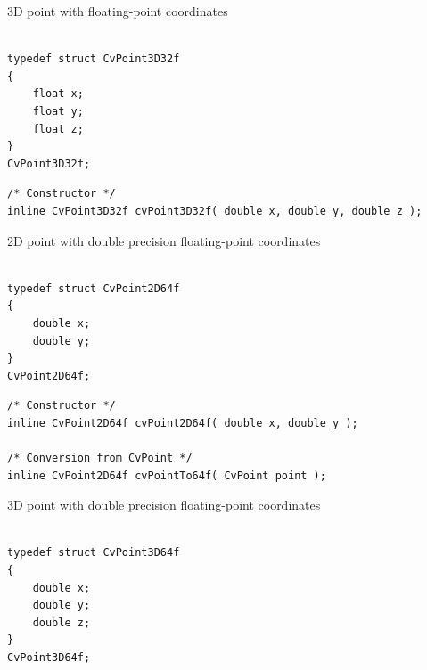 \label{CvPoint3D32f}

3D point with floating-point coordinates

\begin{lstlisting}

typedef struct CvPoint3D32f
{
    float x; 
    float y; 
    float z; 
}
CvPoint3D32f;
\end{lstlisting}

\begin{description}
\end{description}

\begin{lstlisting}
/* Constructor */
inline CvPoint3D32f cvPoint3D32f( double x, double y, double z );

\end{lstlisting}

\label{CvPoint2D64f}

2D point with double precision floating-point coordinates

\begin{lstlisting}

typedef struct CvPoint2D64f
{
    double x; 
    double y; 
}
CvPoint2D64f;
\end{lstlisting}

\begin{description}
\end{description}

\begin{lstlisting}
/* Constructor */
inline CvPoint2D64f cvPoint2D64f( double x, double y );

/* Conversion from CvPoint */
inline CvPoint2D64f cvPointTo64f( CvPoint point );

\end{lstlisting}

\label{CvPoint3D64f}

3D point with double precision floating-point coordinates

\begin{lstlisting}

typedef struct CvPoint3D64f
{
    double x; 
    double y; 
    double z; 
}
CvPoint3D64f;
\end{lstlisting}

\begin{description}
\end{description}

